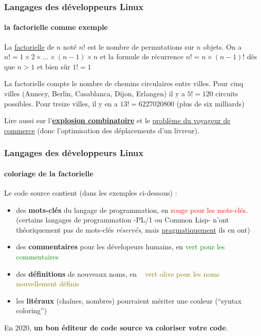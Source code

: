 \documentclass[xcolor=svgnames,final,smaller,a4]{beamer}
\begin{document}
\begin{frame}
  \frametitle{Langages des développeurs Linux}
  \framesubtitle{la factorielle comme exemple}
 
  La \href{https://fr.wikipedia.org/wiki/Factorielle}{factorielle} de
  $n$ noté $n!$ est le nombre de permutations sur $n$ objets. On a $n!
  = 1 \times 2 \times \ldots \times (n-1) \times n$ et la formule de
  récurrence $n! = n \times (n-1)!$ dès que $n>1$ et bien sûr $1! = 1$

  \vspace{0.5cm}
  La factorielle compte le nombre de chemins circulaires entre
  villes. Pour cinq villes (Annecy, Berlin, Casablanca, Dijon,
  Erlangen) il y a $5! = 120$ circuits possibles. Pour treize villes,
  il y en a $13! = 6 227 020 800$ (plus de six milliards)

  \vspace{0.5cm}
  
  Lire aussi sur
  l'\href{https://fr.wikipedia.org/wiki/Explosion_combinatoire}{\textbf{explosion
      combinatoire}} et le
  \href{https://fr.wikipedia.org/wiki/Problème_du_voyageur_de_commerce}{problème
    du voyageur de commerce} (donc l'optimisation des déplacements
  d'un livreur).
\end{frame}

\begin{frame}
  \frametitle{Langages des développeurs Linux}
  \framesubtitle{coloriage de la factorielle}

  Le code source contient (dans les exemples ci-dessous) :

  \begin{itemize}

  \item des \textbf{mots-clés} du langage de programmation, en
    \textcolor{red}{rouge pour les mots-clés}.\\ {\small (certains
      langages de programmation -PL/1 ou Common Lisp- n'ont
      théoriquement pas de mots-clés \textit{réservés}, mais
      \href{https://www.cs.rochester.edu/~scott/pragmatics/}{pragmatiquement}
      ils en ont)}

  \item des \textbf{commentaires} pour les dévelopeurs humains, en
    \textcolor{green}{vert pour les commentaires}

  \item des \textbf{définitions} de nouveaux noms, en ~ \textcolor{Olive}{vert olive pour les noms nouvellement définis}

  \item les \textbf{litéraux} (chaînes, nombres) pourraient mériter
    une couleur (``syntax coloring'')
    
  \end{itemize}

  \vspace{0.5cm}
  
En 2020, \textbf{un bon éditeur de code source va coloriser votre code}.
  
\end{frame}
\end{document}
